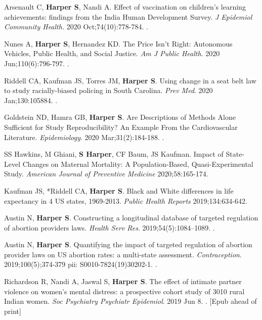 \documentclass[
  letterpaper,
  DIV=11,
  numbers=noendperiod]{scrartcl}
\begin{document}
\begin{etaremune}
\item *Arsenault C, \textbf{Harper S}, Nandi A. Effect of vaccination on children's learning achievements: findings from the India Human Development Survey. \emph{J Epidemiol Community Health.} 2020 Oct;74(10):778-784. . 

\item Nunes A, \textbf{Harper S}, Hernandez KD. The Price Isn't Right: Autonomous Vehicles, Public Health, and Social Justice. \emph{Am J Public Health}. 2020 Jun;110(6):796-797. .

\item *Riddell CA, Kaufman JS, Torres JM, \textbf{Harper S}. Using change in a seat belt law to study racially-biased policing in South Carolina. \emph{Prev Med}. 2020 Jan;130:105884. .

\item Goldstein ND, Hamra GB, \textbf{Harper S}. Are Descriptions of Methods Alone Sufficient for Study Reproducibility? An Example From the Cardiovascular Literature.
\emph{Epidemiology}. 2020 Mar;31(2):184-188. .

\item SS Hawkins, M Ghiani, \textbf{S Harper}, CF Baum, JS Kaufman. Impact of State-Level Changes on Maternal Mortality: A Population-Based, Quasi-Experimental Study. \emph{American Journal of Preventive Medicine} 2020;58:165-174.

\item Kaufman JS, *Riddell CA, \textbf{Harper S}. Black and White differences in life expectancy in 4 US states, 1969-2013. \emph{Public Health Reports} 2019;134:634-642.

\item *Austin N, \textbf{Harper S}. Constructing a longitudinal database of targeted regulation of abortion providers laws. \emph{Health Serv Res}. 2019;54(5):1084–1089. . 

\item *Austin N, \textbf{Harper S}. Quantifying the impact of targeted regulation of abortion provider laws on US abortion rates: a multi-state assessment. \emph{Contraception}. 2019;100(5);374-379 pii: S0010-7824(19)30202-1. . 

\item *Richardson R, Nandi A, Jaswal S, \textbf{Harper S}. The effect of intimate partner violence on women's mental distress: a prospective cohort study of 3010 rural Indian women. \emph{Soc Psychiatry Psychiatr Epidemiol}. 2019 Jun 8. . [Epub ahead of print]


\end{etaremune}
\end{document}
